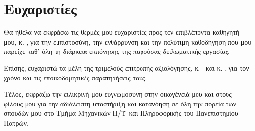 
\chapter*{Ευχαριστίες}

Θα ήθελα να εκφράσω τις θερμές μου ευχαριστίες προς τον επιβλέποντα καθηγητή μου, κ. \thesissupervisor, για την εμπιστοσύνη, την ενθάρρυνση και την πολύτιμη καθοδήγηση που μου παρείχε καθ' όλη τη διάρκεια εκπόνησης της παρούσας διπλωματικής εργασίας.

Επίσης, ευχαριστώ τα μέλη της τριμελούς επιτροπής αξιολόγησης, κ. \thesiscommitteefirst\ και κ. \thesiscommitteesecond, για τον χρόνο και τις εποικοδομητικές παρατηρήσεις τους.

Τέλος, εκφράζω την ειλικρινή μου ευγνωμοσύνη στην οικογένειά μου και στους φίλους μου για την αδιάλειπτη υποστήριξη και κατανόηση σε όλη την πορεία των σπουδών μου στο Τμήμα Μηχανικών Η/Υ και Πληροφορικής του Πανεπιστημίου Πατρών.

\vspace{2.0cm}

\begin{flushright}
    \thesisauthor \\
    \thesisdate
\end{flushright}

\clearemptydoublepage
